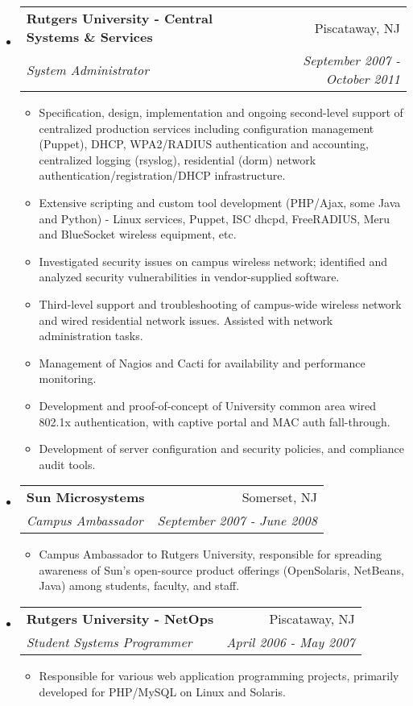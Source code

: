 \documentclass[letterpaper,11pt]{article}
\makeatletter
\newcommand{\resitem}[1]{\item #1 \vspace{-2pt}}
\newcommand{\ressubheading}[4]{
\begin{tabular*}{7.0in}{l@{\extracolsep{\fill}}r}
		\textbf{#1} & #2 \\
		\textit{#3} & \textit{#4} \\
\end{tabular*}\vspace{-6pt}}
\makeatother
\begin{document}
\begin{itemize}
\item
	\ressubheading{Rutgers University - Central Systems \&
          Services}{Piscataway, NJ}{System Administrator}{September 2007 - October 2011}
	\begin{itemize}
                \resitem{Specification, design, implementation and ongoing second-level support of centralized production services including configuration management (Puppet), DHCP, WPA2/RADIUS authentication and accounting, centralized logging (rsyslog), residential (dorm) network authentication/registration/DHCP infrastructure.}
                \resitem{Extensive scripting and custom tool development
                  (PHP/Ajax, some Java and Python)
                  - Linux services, Puppet, ISC dhcpd, FreeRADIUS, Meru and BlueSocket wireless equipment, etc.}
                \resitem{Investigated security issues on campus wireless network; identified and analyzed security vulnerabilities in vendor-supplied software.}
                \resitem{Third-level support and troubleshooting of campus-wide wireless network and wired residential network issues. Assisted with network administration tasks.}
                \resitem{Management of Nagios and Cacti for availability and performance monitoring.}
		\resitem{Development and proof-of-concept of University common area wired 802.1x authentication, with captive portal and MAC auth fall-through.}
		\resitem{Development of server configuration and security
                  policies, and compliance audit tools.}
	\end{itemize}

\item
        \ressubheading{Sun Microsystems}{Somerset, NJ}{Campus Ambassador}{September 2007 - June 2008}
        \begin{itemize}
                \resitem{Campus Ambassador to Rutgers University, responsible for spreading awareness of Sun's open-source product offerings (OpenSolaris, NetBeans, Java) among students, faculty, and staff.}
        \end{itemize}

\item
	\ressubheading{Rutgers University - NetOps}{Piscataway, NJ}{Student Systems Programmer}{April 2006 - May 2007}
	\begin{itemize}
		\resitem{Responsible for various web application programming projects, primarily developed for
                  PHP/MySQL on Linux and Solaris.}
	\end{itemize}

\end{itemize}
\end{document}
